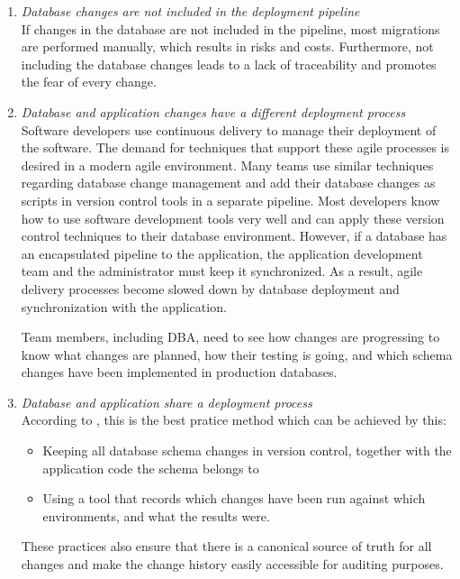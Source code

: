 \begin{enumerate}
	\item \textit{Database changes are not included in the deployment pipeline}\\
	If changes in the database are not included in the pipeline, most migrations are performed manually, which results in risks and costs. Furthermore, not including the database changes leads to a lack of traceability and promotes the fear of every change.	
	
	\item \textit{Database and application changes have a different deployment process}\\
	Software developers use continuous delivery to manage their deployment of the software. The demand for techniques that support these agile processes is desired in a modern agile environment. Many teams use similar techniques regarding database change management and add their database changes as scripts in version control tools in a separate pipeline. Most developers know how to use software development tools very well and can apply these version control techniques to their database environment. However, if a database has an encapsulated pipeline to the application, the application development team and the administrator must keep it synchronized. As a result, agile delivery processes become slowed down by database deployment and synchronization with the application.

	Team members, including \gls{DBA}, need to see how changes are progressing to know what changes are planned, how their testing is going, and which schema changes have been implemented in production databases.
	
	\item \textit{Database and application share a deployment process}\\
	According to  \cite{GoogleDevOps2022}, this is the best pratice method which can be achieved by this:
	\begin{itemize}
		\item Keeping all database schema changes in version control, together with the application code the schema belongs to
		\item Using a tool that records which changes have been run against which environments, and what the results were.
	\end{itemize}
	These practices also ensure that there is a canonical source of truth for all changes and make the change history easily accessible for auditing purposes.
\end{enumerate}



